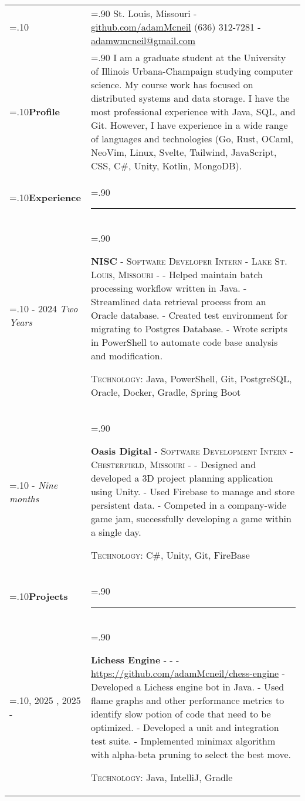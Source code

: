 \documentclass[10pt]{article}
\newcommand{\timeFrame}[3] {
  \if\relax\detokenize{#2}\relax
    #1
  \else
    #1 - #2
  \fi
  \newline
  \scriptsize \textit{#3}
}
\newcommand{\entry}[6] {
  \textbf{#1}
  \if\relax\detokenize{#2}\relax
  \else
       - \textsc{#2}
  \fi
  \if\relax\detokenize{#3}\relax
  \else
      - \textsc{#3}
  \fi
  \if\relax\detokenize{#4}\relax
  \else
      - \href{https://#4}{#4}
  \fi
  \newline #5
  \if\relax\detokenize{#6}\relax
  \else
      \newline \textsc{Technology:} #6
  \fi
  \\
}
\newcommand{\horizontalLine}[0] {
    \noindent\rule{.90\linewidth}{0.4pt}
}
\begin{document}

\begin{tabularx}{\linewidth}{>{\hsize=.10\hsize}X>{\hsize=.90\hsize}X}

{\bfseries\large Adam McNeil} &
St. Louis, Missouri - \href{https://github.com/adamMcneil}{github.com/adamMcneil}\newline
{(636) 312-7281 \hspace{5.5mm} - \href{mailto:adamwmcneil@gmail.com}{adamwmcneil@gmail.com}} \\[5pt]

\textbf{Profile} &
{
  I am a graduate student at the University of Illinois Urbana-Champaign studying computer science.
  My course work has focused on distributed systems and data storage.
  I have the most professional experience with Java, SQL, and Git.
  However, I have experience in a wide range of languages and technologies (Go, Rust, OCaml, NeoVim, Linux, Svelte, Tailwind, JavaScript, CSS, C\#, Unity, Kotlin, MongoDB).
 \newline
} \\

\textbf{Experience} & \horizontalLine \\

\timeFrame{2023}{2024}{Two Years} &
\entry{NISC}
  {Software Developer Intern}
  {Lake St. Louis, Missouri}
  {}
  {
  - Helped maintain batch processing workflow written in Java. \newline
  - Streamlined data retrieval process from an Oracle database. \newline
  - Created test environment for migrating to Postgres Database. \newline
  - Wrote scripts in PowerShell to automate code base analysis and modification.
  }
  {Java, PowerShell, Git, PostgreSQL, Oracle, Docker, Gradle, Spring Boot \newline}

\timeFrame{2022}{}{Nine months} &
\entry{Oasis Digital}
  {Software Development Intern}
  {Chesterfield, Missouri}
  {}
  {
  - Designed and developed a 3D project planning application using Unity. \newline
  - Used Firebase to manage and store persistent data. \newline
  - Competed in a company-wide game jam, successfully developing a game within a single day.
  }
  {C\#, Unity, Git, FireBase}


\textbf{Projects} & \horizontalLine \\
\timeFrame{2021, 2025}{}{} &
\entry{Lichess Engine}
  {}
  {}
  {https://github.com/adamMcneil/chess-engine}
  {
    - Developed a Lichess engine bot in Java. \newline
    - Used flame graphs and other performance metrics to identify slow potion of code that need to be optimized. \newline
    - Developed a unit and integration test suite. \newline
    - Implemented minimax algorithm with alpha-beta pruning to select the best move.
  }
  {Java, IntelliJ, Gradle}


\end{tabularx}
\end{document}
